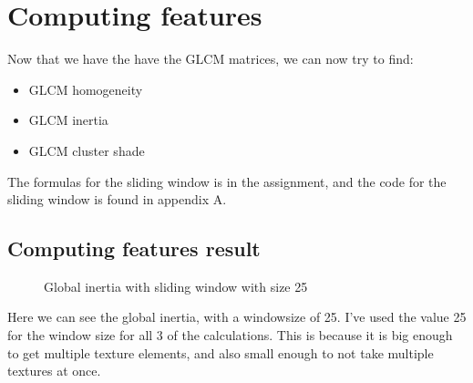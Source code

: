 \documentclass{article}
\begin{document}
\section{Computing features}
	Now that we have the have the GLCM matrices, we can now try to find:
	\begin{itemize}
		\item GLCM homogeneity
		\item GLCM inertia
		\item GLCM cluster shade
	\end{itemize}
	The formulas for the sliding window is in the assignment, and the code for the sliding window is found in appendix A.
\newpage
\subsection{Computing features result}
	\begin{figure}[h]%
		\centering
	    \qquad
	    \caption{Global inertia with sliding window with size 25}%
    	\label{fig:INERTIA}%
\end{figure}
Here we can see the global inertia, with a windowsize of 25. I've used the value 25 for the window size for all 3 of the calculations. This is because it is big enough to get multiple texture elements, and also small enough to not take multiple textures at once.   
\end{document}

